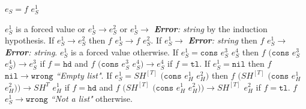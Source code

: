 \begin{case}
$e_{S}=f$ $e_{S}^{1}$

$e_{S}^{1}$ is a forced value or $e_{S}^{1}\rightarrow e_{S}^{2}$ or $e_{S}^{1}\rightarrow$ \emph{\textbf{Error}: string} by the induction hypothesis.  If $e_{S}^{1}\rightarrow e_{S}^{2}$ then $f$ $e_{S}^{1}\rightarrow f$ $e_{S}^{2}$.  If $e_{S}^{1}\rightarrow$ \emph{\textbf{Error}: string} then $f$ $e_{S}^{1}\rightarrow$ \emph{\textbf{Error}: string}.  $e_{S}^{1}$ is a forced value otherwise.  If $e_{S}^{1}=\mathtt{cons}$ $e_{S}^{3}$ $e_{S}^{4}$ then $f$ $(\mathtt{cons}$ $e_{S}^{3}$ $e_{S}^{4})\rightarrow e_{S}^{3}$ if $f=\mathtt{hd}$ and $f$ $(\mathtt{cons}$ $e_{S}^{3}$ $e_{S}^{4})\rightarrow e_{S}^{4}$ if $f=\mathtt{tl}$.  If $e_{S}^{1}=\mathtt{nil}$ then $f$ $\mathtt{nil}\rightarrow\mathtt{wrong}$ \emph{``Empty list"}.  If $e_{S}^{1}=SH^{[T]}$ $(\mathtt{cons}$ $e_{H}^{1}$ $e_{H}^{2})$ then $f$ $(SH^{[T]}$ $(\mathtt{cons}$ $e_{H}^{1}$ $e_{H}^{2}))\rightarrow SH^{T}$ $e_{H}^{1}$ if $f=\mathtt{hd}$ and $f$ $(SH^{[T]}$ $(\mathtt{cons}$ $e_{H}^{1}$ $e_{H}^{2}))\rightarrow SH^{[T]}$ $e_{H}^{2}$ if $f=\mathtt{tl}$.  $f$ $e_{S}^{1}\rightarrow\mathtt{wrong}$ \emph{``Not a list"} otherwise.
\end{case}